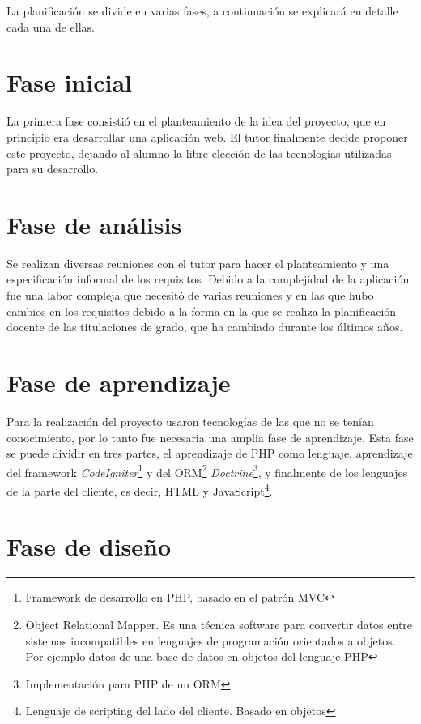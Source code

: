 
La planificación se divide en varias fases, a continuación se explicará en detalle cada una de ellas.

\section{Fase inicial}

La primera fase consistió en el planteamiento de la idea del proyecto, que en principio era desarrollar una aplicación web. El tutor finalmente decide proponer este proyecto, dejando al alumno la libre elección de las tecnologías utilizadas para su desarrollo.

\section{Fase de análisis}

Se realizan diversas reuniones con el tutor para hacer el planteamiento y una especificación informal de los requisitos. Debido a la complejidad de la aplicación fue una labor compleja que necesitó de varias reuniones y en las que hubo cambios en los requisitos debido a la forma en la que se realiza la planificación docente de las titulaciones de grado, que ha cambiado durante los últimos años.

\section{Fase de aprendizaje}

Para la realización del proyecto usaron tecnologías de las que no se tenían conocimiento, por lo tanto fue necesaria una amplia fase de aprendizaje. Esta fase se puede dividir en tres partes, el aprendizaje de PHP como lenguaje, aprendizaje del framework {\em CodeIgniter}\footnote{Framework de desarrollo en PHP, basado en el patrón MVC} y del ORM\footnote{Object Relational Mapper. Es una técnica software para convertir datos entre sistemas incompatibles en lenguajes de programación orientados a objetos. Por ejemplo datos de una base de datos en objetos del lenguaje PHP} {\em Doctrine}\footnote{Implementación para PHP de un ORM}, y finalmente de los lenguajes de la parte del cliente, es decir, HTML y JavaScript\footnote{Lenguaje de scripting del lado del cliente. Basado en objetos}.

\section{Fase de diseño}

